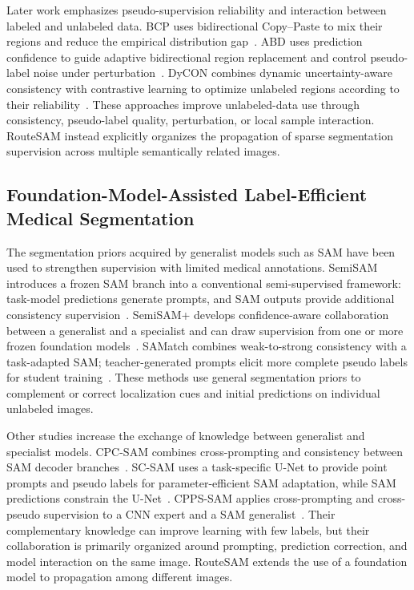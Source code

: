 \documentclass[a4paper,fleqn]{cas-dc}
\begin{document}
Later work emphasizes pseudo-supervision reliability and interaction between labeled and unlabeled data. BCP uses bidirectional Copy--Paste to mix their regions and reduce the empirical distribution gap~\cite{bai2023bcp}. ABD uses prediction confidence to guide adaptive bidirectional region replacement and control pseudo-label noise under perturbation~\cite{chi2024abd}. DyCON combines dynamic uncertainty-aware consistency with contrastive learning to optimize unlabeled regions according to their reliability~\cite{assefa2025dycon}. These approaches improve unlabeled-data use through consistency, pseudo-label quality, perturbation, or local sample interaction. RouteSAM instead explicitly organizes the propagation of sparse segmentation supervision across multiple semantically related images.

\subsection{Foundation-Model-Assisted Label-Efficient Medical Segmentation}

The segmentation priors acquired by generalist models such as SAM have been used to strengthen supervision with limited medical annotations. SemiSAM introduces a frozen SAM branch into a conventional semi-supervised framework: task-model predictions generate prompts, and SAM outputs provide additional consistency supervision~\cite{zhang2023semisam}. SemiSAM+ develops confidence-aware collaboration between a generalist and a specialist and can draw supervision from one or more frozen foundation models~\cite{zhang2025semisamplus}. SAMatch combines weak-to-strong consistency with a task-adapted SAM; teacher-generated prompts elicit more complete pseudo labels for student training~\cite{xu2024samatch}. These methods use general segmentation priors to complement or correct localization cues and initial predictions on individual unlabeled images.

Other studies increase the exchange of knowledge between generalist and specialist models. CPC-SAM combines cross-prompting and consistency between SAM decoder branches~\cite{miao2024cpcsam}. SC-SAM uses a task-specific U-Net to provide point prompts and pseudo labels for parameter-efficient SAM adaptation, while SAM predictions constrain the U-Net~\cite{vu2026scsam}. CPPS-SAM applies cross-prompting and cross-pseudo supervision to a CNN expert and a SAM generalist~\cite{zhang2026cppssam}. Their complementary knowledge can improve learning with few labels, but their collaboration is primarily organized around prompting, prediction correction, and model interaction on the same image. RouteSAM extends the use of a foundation model to propagation among different images.
\end{document}
